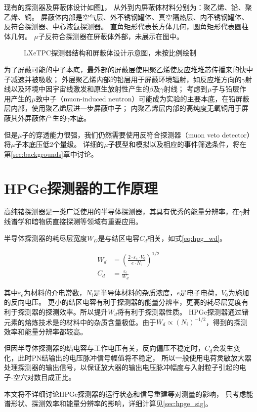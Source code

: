 现有的探测器及屏蔽体设计如图\ref{}，
从外到内屏蔽体材料分别为：聚乙烯、铅、聚乙烯、铜。
屏蔽体内部是空气层、外不锈钢罐体、真空隔热层、内不锈钢罐体、反符合探测器、中心液氙探测器。
直角矩形代表长方体几何，圆角矩形代表圆柱体几何。
$\mu$子反符合探测器在屏蔽体外部，未展示在图中。

\begin{figure}
    \centering
    
    \caption{\label{fig:relics_geo} LXeTPC探测器结构和屏蔽体设计示意图，未按比例绘制}
\end{figure}

为了屏蔽可能的中子本底，最外部的屏蔽层使用聚乙烯使反应堆堆芯传播来的快中子减速并被吸收；
外层聚乙烯内部的铅层用于屏蔽环境辐射，如反应堆方向的$\gamma$射线以及环境中因宇宙线激发和原生放射性产生的$\beta$及$\gamma$射线；
考虑到$\mu$子与铅层作用产生的$\mu$致中子（muon-induced neutron）可能成为实验的主要本底，在铅屏蔽层内部，使用聚乙烯层进一步屏蔽中子；
内聚乙烯层内部的高纯度无氧铜用于屏蔽其外屏蔽体产生的$\gamma$本底。

但是$\mu$子的穿透能力很强，我们仍然需要使用反符合探测器（muon veto detector）将$\mu$子本底压低2个量级。
详细的$\mu$子模型和模拟以及相应的事件筛选条件，将在第\ref{sec:backgrounds}章中讨论。

\section{HPGe探测器的工作原理}

高纯锗探测器是一类广泛使用的半导体探测器，其具有优秀的能量分辨率，在$\gamma$射线谱学和暗物质直接探测等领域有重要应用。

半导体探测器的耗尽层宽度$W_D$是与结区电容$C_d$相关，如式\ref{eq:hpg_wd}。

\begin{align}
    \label{eq:hpg_wd}
    W_d &= \left(\frac{2\cdot \varepsilon_e\cdot V_0}{e\cdot N_i}\right)^{1/2} \\
    C_d &= \frac{\varepsilon_e}{W_d}
\end{align}

其中$\varepsilon_e$为材料的介电常数，$N_i$是半导体材料的杂质浓度，$e$是电子电荷，$V_0$为施加的反向电压。
更小的结区电容有利于探测器的能量分辨率，更高的耗尽层宽度有利于探测器的探测效率。所以提升$W_d$将有利于探测器性质。
HPGe探测器通过锗元素的熔炼技术是的材料中的杂质含量极低。由于$W_d\propto (N_i)^{-1/2}$，得到的探测效率和能量分辨率都较高。

但因半导体探测器的结电容与工作电压有关，反向偏压不稳定时，$C_d$会发生变化，此时PN结输出的电压脉冲信号幅值将不稳定，
所以一般使用电荷灵敏放大器处理探测器的输出信号，以保证放大器的输出电压脉冲幅度与入射粒子引起的电子-空穴对数目成正比。

本文将不详细讨论HPGe探测器的运行状态和信号重建等对测量的影响，
只考虑能谱形状、探测效率和能量分辨率的影响，详细计算见\ref{sec:hpge_sig}。
